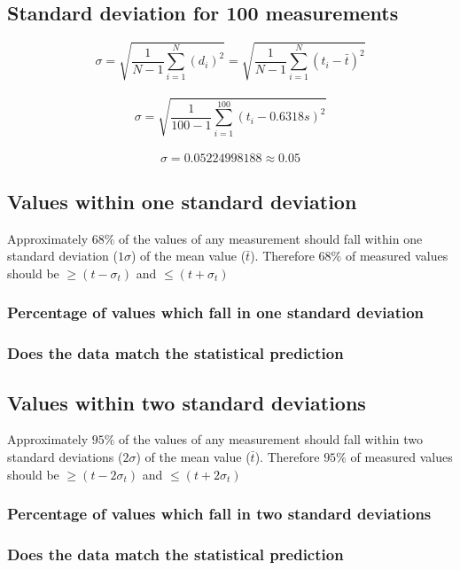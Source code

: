 \documentclass[11pt, letterpaper, includehead]{article}
\begin{document}
  \subsection{Standard deviation for 100 measurements} %

  $$\sigma = \sqrt{\frac{1}{N - 1}\sum_{i = 1}^{N} (d_i)^2} = \sqrt{\frac{1}{N - 1}\sum_{i = 1}^{N} (t_i - \bar{t})^2}$$\\
  $$\sigma = \sqrt{\frac{1}{100 - 1}\sum_{i = 1}^{100}(t_i - 0.6318s)^2}$$\\
  $$\sigma = 0.05224998188 \approx 0.05$$

  \subsection{Values within one standard deviation} %
  Approximately $68\%$ of the values of any measurement should fall within one 
  standard deviation ($1 \sigma$) of the mean value ($\bar{t}$). Therefore $68\%$ of measured 
  values should be $\geq (t - \sigma_t)$ and $\leq (t + \sigma_t)$

  \subsubsection{Percentage of values which fall in one standard deviation}

  \subsubsection{Does the data match the statistical prediction}

  \subsection{Values within two standard deviations} %
  Approximately $95\%$ of the values of any measurement should fall within two 
  standard deviations ($2 \sigma$) of the mean value ($\bar{t}$). Therefore $95\%$ of measured 
  values should be $\geq (t - 2 \sigma_t)$ and $\leq (t + 2 \sigma_t)$

  \subsubsection{Percentage of values which fall in two standard deviations}

  \subsubsection{Does the data match the statistical prediction}
\end{document}
